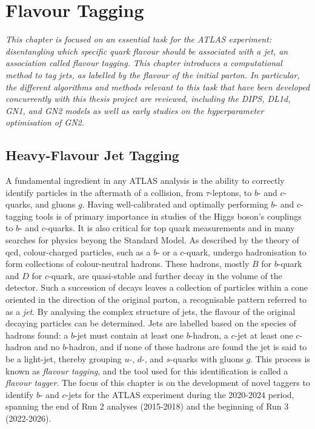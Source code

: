 \chapter{\color{oxfordblue} Flavour Tagging}\label{chap-ftag}
\ChapFrame

\textit{
This chapter is focused on an essential task for the ATLAS experiment: disentangling which specific quark flavour should be associated with a jet, an association called flavour tagging. This chapter introduces a computational method to tag jets, as labelled by the flavour of the initial parton. In particular, the different algorithms and methods relevant to this task that have been developed concurrently with this thesis project are reviewed, including the DIPS, DL1d, GN1, and GN2 models as well as early studies on the hyperparameter optimisation of GN2.
}

\section{Heavy-Flavour Jet Tagging}
A fundamental ingredient in any ATLAS analysis is the ability to correctly identify particles in the aftermath of a collision, from $\tau$-leptons, to $b$- and $c$-quarks, and gluons $g$. Having well-calibrated and optimally performing $b$- and $c$-tagging tools is of primary importance in studies of the Higgs boson's couplings to $b$- and $c$-quarks. It is also critical for top quark measurements and in many searches for physics beyong the Standard Model. As described by the theory of \gls{qcd}, colour-charged particles, such as a $b$- or a $c$-quark, undergo hadronisation to form collections of colour-neutral hadrons. These hadrons, mostly $B$ for $b$-quark and $D$ for $c$-quark, are quasi-stable and further decay in the volume of the detector. Such a succession of decays leaves a collection of particles within a cone oriented in the direction of the original parton, a recognisable pattern referred to as a \textit{jet}. By analysing the complex structure of jets, the flavour of the original decaying particles can be determined. Jets are labelled based on the species of hadrons found: a $b$-jet must contain at least one $b$-hadron, a $c$-jet at least one $c$-hadron and no $b$-hadron, and if none of these hadrons are found the jet is said to be a light-jet, thereby grouping $u$-, $d$-, and $s$-quarks with gluons $g$. This process is known as \textit{flavour tagging}, and the tool used for this identification is called a \textit{flavour tagger}. The focus of this chapter is on the development of novel taggers to identify $b$- and $c$-jets for the ATLAS experiment during the 2020-2024 period, spanning the end of Run 2 analyses (2015-2018) and the beginning of Run 3 (2022-2026). 

